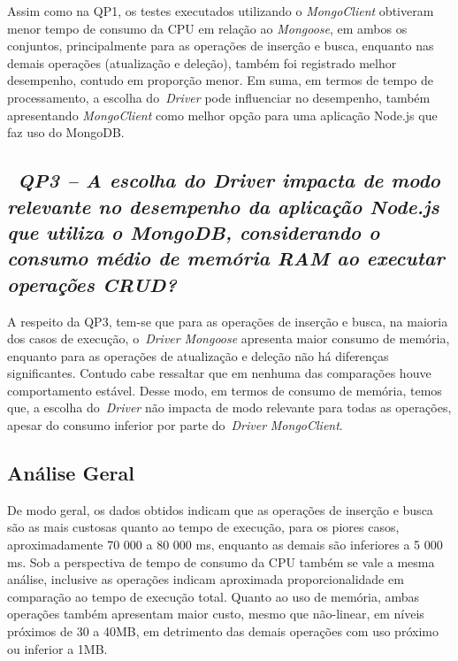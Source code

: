 \documentclass{svproc}
\begin{document}
Assim como na QP1, os testes executados utilizando o \emph{MongoClient} obtiveram menor tempo de consumo da CPU em relação ao \emph{Mongoose}, em ambos os conjuntos, principalmente para as operações de inserção e busca, enquanto nas demais operações (atualização e deleção), também foi registrado melhor desempenho, contudo em proporção menor.
Em suma, em termos de tempo de processamento, a escolha do~\emph{Driver} pode influenciar no desempenho, também apresentando \emph{MongoClient} como melhor opção para uma aplicação Node.js que faz uso do MongoDB.

\subsection{~\emph{QP3 -- A escolha do Driver impacta de modo relevante no desempenho da aplicação Node.js que utiliza o MongoDB, considerando o consumo médio de memória RAM ao executar operações CRUD?}}
\label{q3}

A respeito da QP3, tem-se que para as operações de inserção e busca, na maioria dos casos de execução, o~\emph{Driver} \emph{Mongoose} apresenta maior consumo de memória, enquanto para as operações de atualização e deleção não há diferenças significantes.
Contudo cabe ressaltar que em nenhuma das comparações houve comportamento estável.
Desse modo, em termos de consumo de memória, temos que, a escolha do~\emph{Driver} não impacta de modo relevante para todas as operações, apesar do consumo inferior por parte do~\emph{Driver} \emph{MongoClient}.

\subsection{Análise Geral}
\label{qgeral}

De modo geral, os dados obtidos indicam que as operações de inserção e busca são as mais custosas quanto ao tempo de execução, para os piores casos, aproximadamente 70 000 a 80 000 ms, enquanto as demais são inferiores a 5 000 ms.
Sob a perspectiva de tempo de consumo da CPU também se vale a mesma análise, inclusive as operações indicam aproximada proporcionalidade em comparação ao tempo de execução total.
Quanto ao uso de memória, ambas operações também apresentam maior custo, mesmo que não-linear, em níveis próximos de 30 a 40MB, em detrimento das demais operações com uso próximo ou inferior a 1MB.
\end{document}
